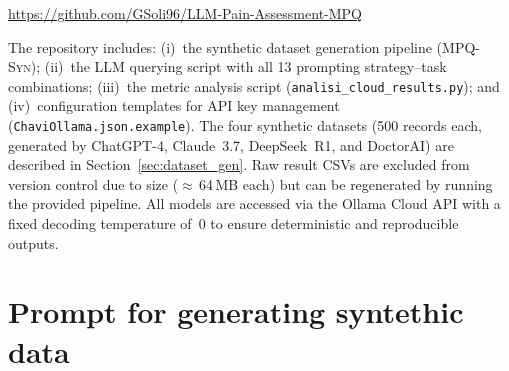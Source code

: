 \documentclass[preprint,12pt,authoryear]{elsarticle}
\newcommand{\dbsuite}{\small\textsc{MPQ-Syn}\xspace}
\begin{document}
\begin{center}
\url{https://github.com/GSoli96/LLM-Pain-Assessment-MPQ}
\end{center}

The repository includes: (i)~the synthetic dataset generation pipeline (\dbsuite); (ii)~the LLM querying script with all 13 prompting strategy--task combinations; (iii)~the metric analysis script (\texttt{analisi\_cloud\_results.py}); and (iv)~configuration templates for API key management (\texttt{ChaviOllama.json.example}). The four synthetic datasets (500 records each, generated by ChatGPT-4, Claude~3.7, DeepSeek~R1, and DoctorAI) are described in Section~\ref{sec:dataset_gen}. Raw result CSVs are excluded from version control due to size ($\approx$\,64\,MB each) but can be regenerated by running the provided pipeline. All models are accessed via the Ollama Cloud API with a fixed decoding temperature of~0 to ensure deterministic and reproducible outputs.




\clearpage
\appendix
\section{Prompt for generating syntethic data\label{app:app1}}
\end{document}
